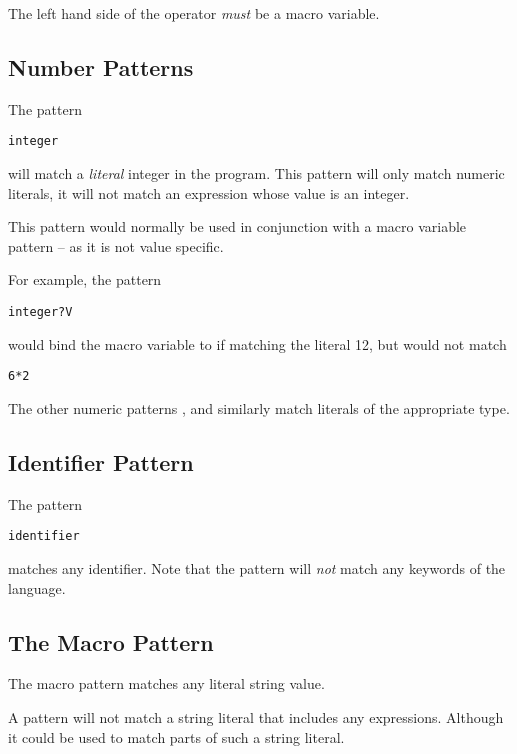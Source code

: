 \begin{aside}
The left hand side of the  operator \emph{must} be a macro variable.
\end{aside}

\subsection{Number Patterns}
The pattern 
\begin{alltt}
integer
\end{alltt}
will match a \emph{literal} integer in the program.
This pattern will only match numeric literals, it will not match an expression whose value is an integer.
\begin{aside}
This pattern would normally be used in conjunction with a macro variable pattern -- as it is not value specific.
\end{aside}
For example, the pattern
\begin{alltt}
integer?V
\end{alltt}
would bind the macro variable  to  if matching the literal 12, but would not match
\begin{alltt}
6*2
\end{alltt}
The other numeric patterns ,  and  similarly match literals of the appropriate type.

\subsection{Identifier Pattern}
The pattern
\begin{alltt}
identifier
\end{alltt}
matches any identifier. Note that the  pattern will \emph{not} match any keywords of the language.

\subsection{The  Macro Pattern}
The  macro pattern matches any literal string value.
\begin{aside}
A  pattern will not match a string literal that includes any  expressions. Although it could be used to match parts of such a string literal.
\end{aside}


